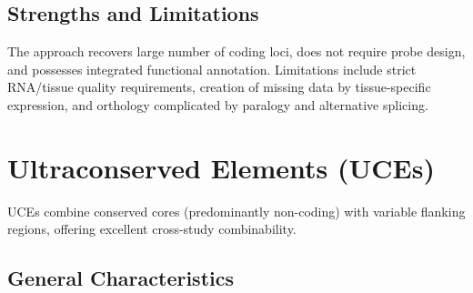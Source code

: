 \subsection{Strengths and Limitations}

The approach recovers large number of coding loci, does not require probe design, and possesses integrated functional annotation. Limitations include strict RNA/tissue quality requirements, creation of missing data by tissue-specific expression, and orthology complicated by paralogy and alternative splicing.

\textcite{dunn2008, misof2014, onetp2019, figuet2014}

\section{Ultraconserved Elements (UCEs)}

UCEs combine conserved cores (predominantly non-coding) with variable flanking regions, offering excellent cross-study combinability.

\subsection{General Characteristics}

